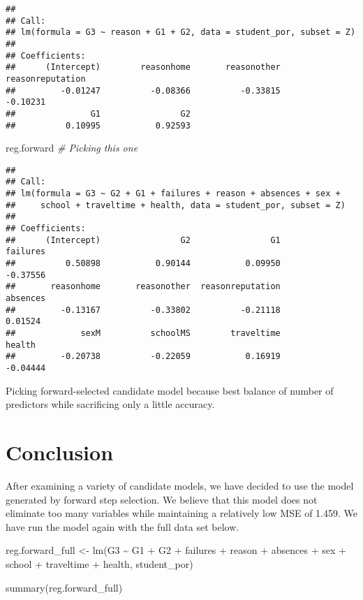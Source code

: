 \documentclass[
]{article}
\newenvironment{Shaded}{\begin{snugshade}}{\end{snugshade}}
\newcommand{\CommentTok}[1]{\textcolor[rgb]{0.56,0.35,0.01}{\textit{#1}}}
\newcommand{\FunctionTok}[1]{\textcolor[rgb]{0.00,0.00,0.00}{#1}}
\newcommand{\NormalTok}[1]{#1}
\newcommand{\OtherTok}[1]{\textcolor[rgb]{0.56,0.35,0.01}{#1}}
\newcommand{\SpecialCharTok}[1]{\textcolor[rgb]{0.00,0.00,0.00}{#1}}
\begin{document}
\begin{verbatim}
## 
## Call:
## lm(formula = G3 ~ reason + G1 + G2, data = student_por, subset = Z)
## 
## Coefficients:
##      (Intercept)        reasonhome       reasonother  reasonreputation  
##         -0.01247          -0.08366          -0.33815          -0.10231  
##               G1                G2  
##          0.10995           0.92593
\end{verbatim}

\begin{Shaded}
\begin{Highlighting}[]
\NormalTok{reg.forward }\CommentTok{\# Picking this one}
\end{Highlighting}
\end{Shaded}

\begin{verbatim}
## 
## Call:
## lm(formula = G3 ~ G2 + G1 + failures + reason + absences + sex + 
##     school + traveltime + health, data = student_por, subset = Z)
## 
## Coefficients:
##      (Intercept)                G2                G1          failures  
##          0.50898           0.90144           0.09950          -0.37556  
##       reasonhome       reasonother  reasonreputation          absences  
##         -0.13167          -0.33802          -0.21118           0.01524  
##             sexM          schoolMS        traveltime            health  
##         -0.20738          -0.22059           0.16919          -0.04444
\end{verbatim}

Picking forward-selected candidate model because best balance of number
of predictors while sacrificing only a little accuracy.

\hypertarget{conclusion}{%
\section{Conclusion}\label{conclusion}}

After examining a variety of candidate models, we have decided to use
the model generated by forward step selection. We believe that this
model does not eliminate too many variables while maintaining a
relatively low MSE of 1.459. We have run the model again with the full
data set below.

\begin{Shaded}
\begin{Highlighting}[]
\NormalTok{reg.forward\_full }\OtherTok{\textless{}{-}} \FunctionTok{lm}\NormalTok{(G3 }\SpecialCharTok{\textasciitilde{}}\NormalTok{ G1 }\SpecialCharTok{+}\NormalTok{ G2 }\SpecialCharTok{+}\NormalTok{ failures }\SpecialCharTok{+}\NormalTok{ reason }\SpecialCharTok{+}\NormalTok{ absences }\SpecialCharTok{+}\NormalTok{ sex }\SpecialCharTok{+}\NormalTok{ school }\SpecialCharTok{+}\NormalTok{ traveltime }\SpecialCharTok{+}\NormalTok{ health, student\_por)}

\FunctionTok{summary}\NormalTok{(reg.forward\_full)}
\end{Highlighting}
\end{Shaded}
\end{document}
